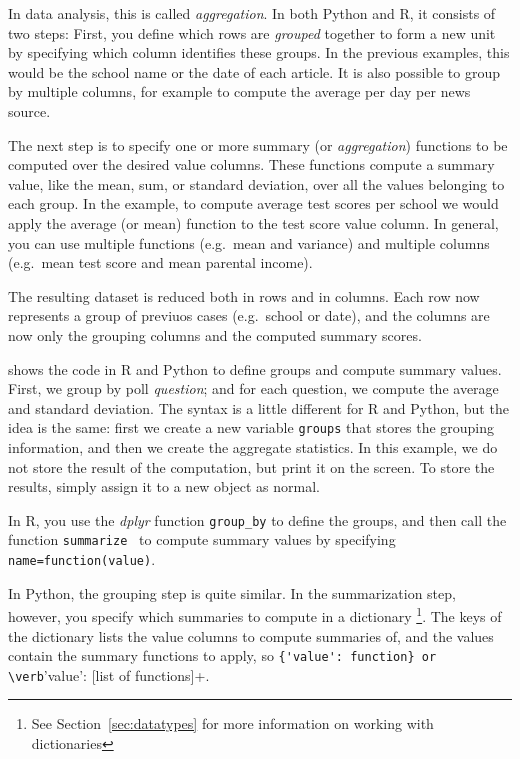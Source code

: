 In data analysis, this is called \emph{aggregation}.
In both Python and R, it consists of two steps:
First, you define which rows are \emph{grouped} together to form a new unit
by specifying which column identifies these groups.
In the previous examples, this would be the school name or the date of each article.
It is also possible to group by multiple columns, for example to compute the average per day per news source.

The next step is to specify one or more summary (or \emph{aggregation}) functions to be computed over the desired value columns.
These functions compute a summary value, like the mean, sum, or standard deviation, over all the values belonging to each group.
In the example, to compute average test scores per school we would apply the average (or mean) function to the test score value column.
In general, you can use multiple functions (e.g.\  mean and variance) and multiple columns (e.g.\ mean test score and mean parental income).

The resulting dataset is reduced both in rows and in columns.
Each row now represents a group of previuos cases (e.g.\ school or date),
and the columns are now only the grouping columns and the computed summary scores.

 shows the code in R and Python to define groups and compute summary values.
First, we group by poll \emph{question}; and for each question, we compute the average and standard deviation.
The syntax is a little different for R and Python, but the idea is the same:
first we create a new variable \verb+groups+ that stores the grouping information,
and then we create the aggregate statistics.
In this example, we do not store the result of the computation, but print it on the screen.
To store the results, simply assign it to a new object as normal.


In R, you use the \emph{dplyr} function \texttt{group\_by}  to define the groups,
and then call the function \texttt{summarize~} to compute summary values by specifying
\verb+name=function(value)+.

In Python, the grouping step is quite similar.
In the summarization step, however, you specify which summaries to compute in a dictionary%
\footnote{See Section~\ref{sec:datatypes} for more information on working with dictionaries}.
The keys of the dictionary lists the value columns to compute summaries of,
and the values contain the summary functions to apply, so  \verb+{'value': function} or \verb+{'value': [list of functions]}+.


